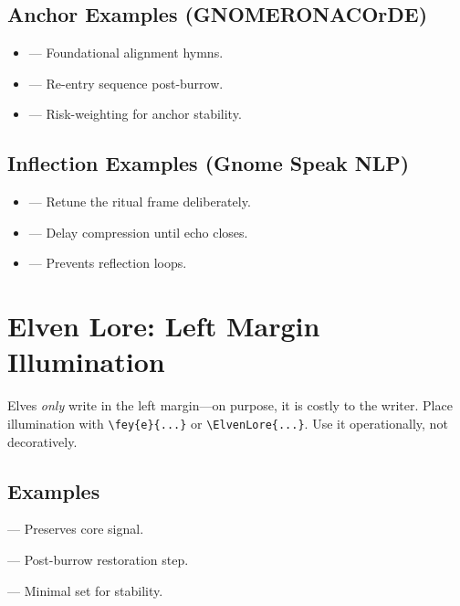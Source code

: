 \documentclass[11pt]{article}
\begin{document}
\subsection*{Anchor Examples (GNOMERONACOrDE)}
\begin{itemize}
  \item {} — Foundational alignment hymns.
  \item {} — Re-entry sequence post-burrow.
  \item {} — Risk-weighting for anchor stability.
\end{itemize}

\subsection*{Inflection Examples (Gnome Speak NLP)}
\begin{itemize}
  \item {} — Retune the ritual frame deliberately.
  \item {} — Delay compression until echo closes.
  \item {} — Prevents reflection loops.
\end{itemize}


\section{Elven Lore: Left Margin Illumination}
Elves \emph{only} write in the left margin—on purpose, it is costly to the writer.
Place illumination with \verb|\fey{e}{...}| or \verb|\ElvenLore{...}|.
Use it operationally, not decoratively.

\subsection*{Examples}
 — Preserves core signal.

 — Post-burrow restoration step.

 — Minimal set for stability.
\end{document}
